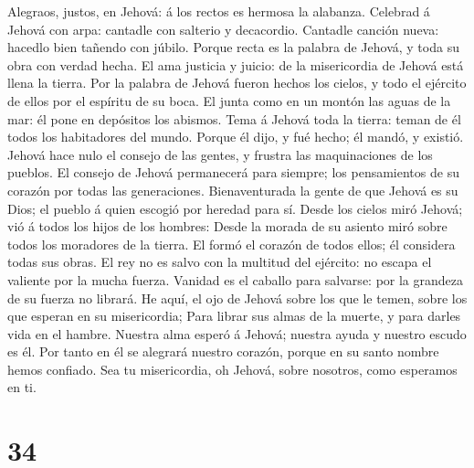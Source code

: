  Alegraos, justos, en Jehová: á los rectos es hermosa la
alabanza.  Celebrad á Jehová con arpa: cantadle con salterio
y decacordio.  Cantadle canción nueva: hacedlo bien tañendo
con júbilo.  Porque recta es la palabra de Jehová, y toda su
obra con verdad hecha.  El ama justicia y juicio: de la
misericordia de Jehová está llena la tierra.  Por la palabra
de Jehová fueron hechos los cielos, y todo el ejército de ellos por el
espíritu de su boca.  El junta como en un montón las aguas
de la mar: él pone en depósitos los abismos.  Tema á Jehová
toda la tierra: teman de él todos los habitadores del mundo.
 Porque él dijo, y fué hecho; él mandó, y existió.
 Jehová hace nulo el consejo de las gentes, y frustra las
maquinaciones de los pueblos.  El consejo de Jehová
permanecerá para siempre; los pensamientos de su corazón por todas las
generaciones.  Bienaventurada la gente de que Jehová es su
Dios; el pueblo á quien escogió por heredad para sí.  Desde
los cielos miró Jehová; vió á todos los hijos de los hombres:
 Desde la morada de su asiento miró sobre todos los
moradores de la tierra.  El formó el corazón de todos
ellos; él considera todas sus obras.  El rey no es salvo
con la multitud del ejército: no escapa el valiente por la mucha fuerza.
 Vanidad es el caballo para salvarse: por la grandeza de su
fuerza no librará.  He aquí, el ojo de Jehová sobre los que
le temen, sobre los que esperan en su misericordia;  Para
librar sus almas de la muerte, y para darles vida en el hambre.
 Nuestra alma esperó á Jehová; nuestra ayuda y nuestro
escudo es él.  Por tanto en él se alegrará nuestro corazón,
porque en su santo nombre hemos confiado.  Sea tu
misericordia, oh Jehová, sobre nosotros, como esperamos en ti.

\hypertarget{section-33}{%
\section{34}\label{section-33}}

